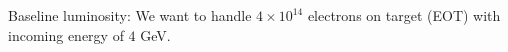 
Baseline luminosity:  We want to handle $4\times 10^{14}$ electrons on target (EOT) with incoming energy of $4$ GeV. 
